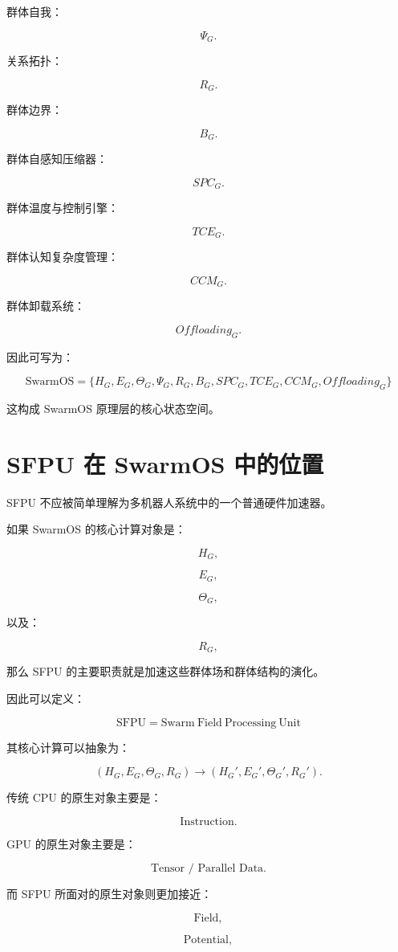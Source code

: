 群体自我：

\[
\Psi_G.
\]

关系拓扑：

\[
R_G.
\]

群体边界：

\[
B_G.
\]

群体自感知压缩器：

\[
SPC_G.
\]

群体温度与控制引擎：

\[
TCE_G.
\]

群体认知复杂度管理：

\[
CCM_G.
\]

群体卸载系统：

\[
Offloading_G.
\]

因此可写为：

\[
\boxed{
\mathrm{SwarmOS}
=
\{
H_G,
E_G,
\Theta_G,
\Psi_G,
R_G,
B_G,
SPC_G,
TCE_G,
CCM_G,
Offloading_G
\}
}
\]

这构成 SwarmOS 原理层的核心状态空间。


\section{SFPU 在 SwarmOS 中的位置}

SFPU 不应被简单理解为多机器人系统中的一个普通硬件加速器。

如果 SwarmOS 的核心计算对象是：

\[
H_G,
\]

\[
E_G,
\]

\[
\Theta_G,
\]

以及：

\[
R_G,
\]

那么 SFPU 的主要职责就是加速这些群体场和群体结构的演化。

因此可以定义：

\[
\boxed{
\mathrm{SFPU}
=
\mathrm{Swarm\ Field\ Processing\ Unit}
}
\]

其核心计算可以抽象为：

\[
(H_G,E_G,\Theta_G,R_G)
\rightarrow
(H_G',E_G',\Theta_G',R_G').
\]

传统 CPU 的原生对象主要是：

\[
\text{Instruction}.
\]

GPU 的原生对象主要是：

\[
\text{Tensor / Parallel Data}.
\]

而 SFPU 所面对的原生对象则更加接近：

\[
\text{Field},
\]

\[
\text{Potential},
\]

